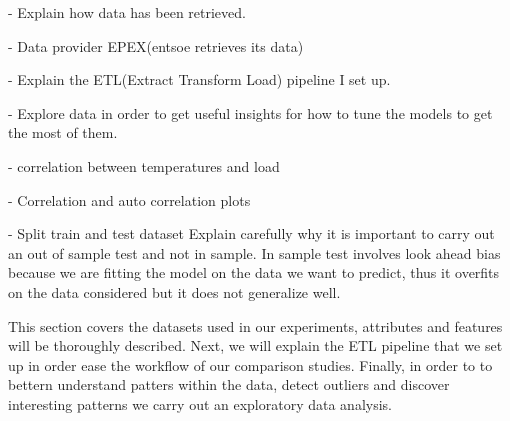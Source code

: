 - Explain how data has been retrieved.

- Data provider EPEX(entsoe retrieves its data)

- Explain the ETL(Extract Transform Load) pipeline
I set up.

- Explore data in order to get useful insights for
how to tune the models to get the most of them.

- correlation between temperatures and load

- Correlation and auto correlation plots

- Split train and test dataset
Explain carefully why it is important to carry
out an out of sample test and not in sample.
In sample test involves look ahead bias because we are
fitting the model on the data we want to predict,
thus it overfits on the data considered but it does
not generalize well.


This section covers the datasets used in our experiments, attributes and features will be thoroughly described.
Next, we will explain the ETL pipeline that we set up in order ease the workflow of our comparison studies.
Finally, in order to to bettern understand patters within the data, detect outliers and discover interesting patterns we carry out an exploratory data analysis.

